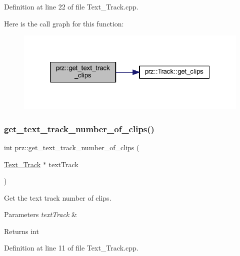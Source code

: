 Definition at line 22 of file Text\+\_\+\+Track.\+cpp.

Here is the call graph for this function\+:
\nopagebreak
\begin{figure}[H]
\begin{center}
\leavevmode
\includegraphics[width=319pt]{namespaceprz_abd2d4f20a28459ce750fa2d4de97ab92_cgraph}
\end{center}
\end{figure}
\mbox{\label{namespaceprz_a479605aa22a06a3128174b575a312da7}} 
\subsubsection{\texorpdfstring{get\_text\_track\_number\_of\_clips()}{get\_text\_track\_number\_of\_clips()}}
{\footnotesize\ttfamily int prz\+::get\+\_\+text\+\_\+track\+\_\+number\+\_\+of\+\_\+clips (\begin{DoxyParamCaption}\item[{\mbox{\hyperlink{classprz_1_1_text___track}{Text\+\_\+\+Track}} $\ast$}]{text\+Track }\end{DoxyParamCaption})}



Get the text track number of clips. 


\begin{DoxyParams}{Parameters}
{\em text\+Track} & \\
\hline
\end{DoxyParams}
\begin{DoxyReturn}{Returns}
int 
\end{DoxyReturn}


Definition at line 11 of file Text\+\_\+\+Track.\+cpp.

